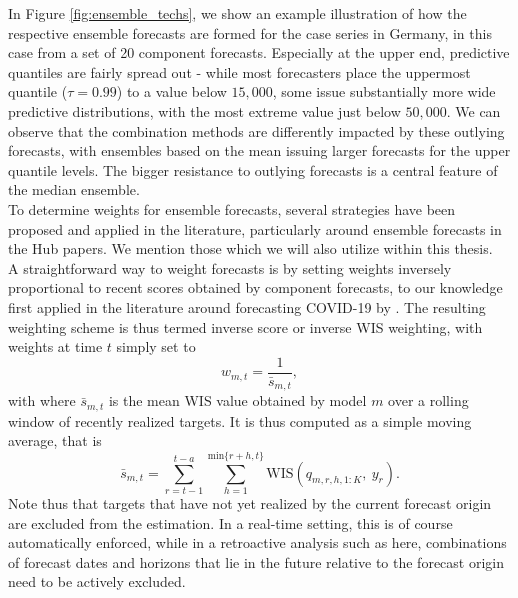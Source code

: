 In Figure \ref{fig:ensemble_techs}, we show an example illustration of how the respective ensemble forecasts are formed for the case series in Germany, in this case from a set of 20 component forecasts. Especially at the upper end, predictive quantiles are fairly spread out - while most forecasters place the uppermost quantile ($\tau = 0.99$) to a value below $15,000$, some issue substantially more wide predictive distributions, with the most extreme value just below $50,000$. We can observe that the combination methods are differently impacted by these outlying forecasts, with ensembles based on the mean issuing larger forecasts for the upper quantile levels. The bigger resistance to outlying forecasts is a central feature of the median ensemble. \\
To determine weights for ensemble forecasts, several strategies have been proposed and applied in the literature, particularly around ensemble forecasts in the Hub papers. We mention those which we will also utilize within this thesis. \\
A straightforward way to weight forecasts is by setting weights inversely proportional to recent scores obtained by component forecasts, to our knowledge first applied in the literature around forecasting COVID-19 by \cite{bracher_german_2020}. The resulting weighting scheme is thus termed inverse score or inverse WIS weighting, with weights at time $t$ simply set to 
\begin{equation}
w_{m,t} = \frac{1}{\bar{s}_{m, t}},
\end{equation}
with
where $\bar{s}_{m, t}$ is the mean WIS value obtained by model $m$ over a rolling window of recently realized targets. It is thus computed as a simple moving average, that is
\begin{equation}
\bar{s}_{m,t} = \sum_{r = t-1}^{t-a}\sum_{h = 1}^{\text{min}\{r+h, t\}} \text{WIS}(q_{m, r, h, 1:K}, \ y_r).
\end{equation}
Note thus that targets that have not yet realized by the current forecast origin are excluded from the estimation. In a real-time setting, this is of course automatically enforced, while in a retroactive analysis such as here, combinations of forecast dates and horizons that lie in the future relative to the forecast origin need to be actively excluded.
